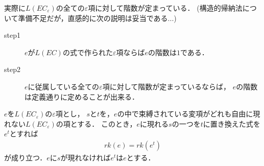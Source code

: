 	実際に$L(EC_{\varepsilon})$の全ての$\varepsilon$項に対して階数が定まっている．
	(構造的帰納法について準備不足だが，直感的に次の説明は妥当である...)
	\begin{description}
		\item[step1] $e$が$L(EC)$の式で作られた$\varepsilon$項ならば$e$の階数は$1$である．
		
		\begin{comment}
		\item[step3] 項$\tau_{1},\cdots,\tau_{n}$のそれぞれに対して，
			その全ての部分$\varepsilon$項に階数が定まっていれば，
			$f$を$n$項関数として，$f\tau_{1}\cdots\tau_{n}$の階数は
			$rk(\tau_{1}),\cdots,rk(\tau_{n})$の中の最大値である．
			というのも，$f\tau_{1}\cdots\tau_{n}$に現れる$\varepsilon$項は
			$\tau_{1},\cdots,\tau_{n}$のいずれかの部分項になっているためである．
			
		\item[step4] 項$\tau_{1},\cdots,\tau_{n}$のそれぞれに対して，
			その全ての部分$\varepsilon$項に階数が定まっていれば，
			$p$を$n$項述語として，$p\tau_{1}\cdots\tau_{n}$の階数は
			$rk(\tau_{1}),\cdots,rk(\tau_{n})$の中の最大値である．
		
		\item[step5] 式$\varphi$と$\psi$のそれぞれに対して，
			その全ての部分$\varepsilon$項に階数が定まっていれば，
			\begin{align}
				rk(\rightharpoondown \varphi) &\coloneqq rk(\varphi), \\
				rk(\vee \varphi \psi) &\coloneqq \max\{rk(\varphi),rk(\psi)\}, \\
				rk(\wedge \varphi \psi) &\coloneqq \max\{rk(\varphi),rk(\psi)\}, \\
				rk(\Longrightarrow \varphi \psi) 
				&\coloneqq \max\{rk(\varphi),rk(\psi)\}, \\
			\end{align}
			である．というのも，左辺の式に現れる$\varepsilon$項は
			$\varphi$か$\psi$の少なくとも一方に現れているからである．
		\end{comment}
		
		\item[step2] $e$に従属している全ての$\varepsilon$項に対して階数が定まっているならば，
			$e$の階数は定義通りに定めることが出来る．
	\end{description}
	
	\begin{screen}
		\begin{metathm}[階数定理]
			$e$を$L(EC_{\varepsilon})$の$\varepsilon$項とし，
			$s$と$t$を，$e$の中で束縛されている変項がどれも自由に現れない$L(EC_{\varepsilon})$の項とする．
			このとき，$e$に現れる$s$の一つを$t$に置き換えた式を$e^{t}$とすれば
			\begin{align}
				rk(e) = rk(e^{t})
			\end{align}
			が成り立つ．$e$に$s$が現れなければ$e^{t}$は$e$とする．
		\end{metathm}
	\end{screen}
	
